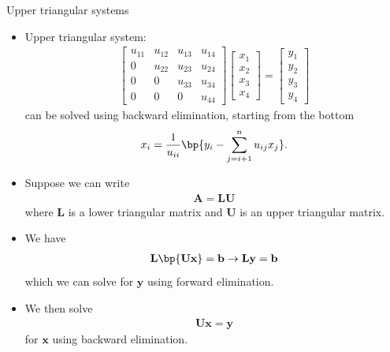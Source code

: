 \documentclass[11pt,xcolor={dvipsnames},aspectratio=159,hyperref={pdftex,pdfpagemode=UseNone,hidelinks,pdfdisplaydoctitle=true},usepdftitle=false]{beamer}
\begin{document}
\begin{frame}{Upper triangular systems}
    \begin{itemize}  
    \item Upper triangular system: 
        \begin{align*}
        \begin{bmatrix}
            u_{11} & u_{12} & u_{13} & u_{14} \\ 
            0 & u_{22} & u_{23} & u_{24} \\ 
            0 & 0 & u_{33} & u_{34} \\ 
            0 & 0 & 0 & u_{44}
        \end{bmatrix}
        \begin{bmatrix}
            x_1 \\ 
            x_2 \\ 
            x_3 \\ 
            x_4
        \end{bmatrix}
        =
        \begin{bmatrix}
            y_1 \\ 
            y_2 \\ 
            y_3 \\ 
            y_4
        \end{bmatrix}
        \end{align*}
        can be solved using backward elimination, starting from the bottom
        \begin{align*}
            x_i = \frac{1}{u_{ii}}\bp{y_i - \sum_{j=i+1}^{n} u_{ij} x_j}.
        \end{align*}
    \end{itemize}
\end{frame}

\begin{frame} 
\begin{itemize} 
    \item Suppose we can write \begin{align*}
        \mathbf{A} = \mathbf{L} \mathbf{U}
    \end{align*}
    where $\mathbf{L}$ is a lower triangular matrix and $\mathbf{U}$ is an upper triangular matrix.
    \item We have \begin{align*}
        \mathbf{L} \bp{\mathbf{U} \mathbf{x}}   = \mathbf{b} \rightarrow \mathbf{L} \mathbf{y}  = \mathbf{b}
    \end{align*}
    which we can solve for $\mathbf{y}$ using forward elimination.
    \item  We then solve \begin{align*}
        \mathbf{U} \mathbf{x} = \mathbf{y}
    \end{align*}
    for $\mathbf{x}$ using backward elimination.
\end{itemize}
\end{frame}
\end{document}

